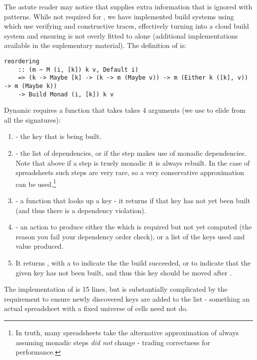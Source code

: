 The astute reader may notice that  supplies extra information that is ignored with \hs{_} patterns. While not required for \Excel, we have implemented build systems using  which use verifying and constructive traces, effectively turning \Excel into a cloud build system and ensuring  is not overly fitted to \Excel alone (additional implementations available in the suplementary material). The definition of  is:

\begin{verbatim}
reordering
    :: (m ~ M (i, [k]) k v, Default i)
    => (k -> Maybe [k] -> (k -> m (Maybe v)) -> m (Either k ([k], v)) -> m (Maybe k))
    -> Build Monad (i, [k]) k v
\end{verbatim}

Dynamic requires a function that takes takes 4 arguments (we use  to elide  from all the signatures):

\begin{enumerate}
\item {} - the key that is being built.
\item {} - the list of dependencies, or  if the step makes use of monadic dependencies. Note that above if a step is truely monadic it is always rebuilt. In the case of spreadsheets such steps are very rare, so a very conservative approximation can be used.\footnote{In truth, many spreadsheets take the alternative approximation of always assuming monadic steps \textit{did not} change - trading correctness for performance.}
\item {} - a function that looks up a key - it returns  if that key has not yet been built (and thus there is a dependency violation).
\item {} - an action to produce either the  which is required but not yet computed (the reason you fail your dependency order check), or a list of the keys used and value produced.
\item It returns , with a  to indicate the the build succeeded, or  to indicate that the given key  has not been built, and thus this key should be moved after .
\end{enumerate}

The implementation of  is 15 lines, but is substantially complicated by the requirement to ensure newly discovered keys are added to the list - something an actual spreadsheet with a fixed universe of cells need not do.

